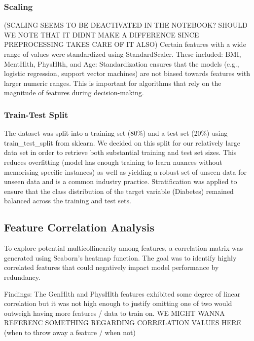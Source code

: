 \documentclass[a4paper,12pt]{article}
\begin{document}
\subsubsection{Scaling}
(SCALING SEEMS TO BE DEACTIVATED IN THE NOTEBOOK? SHOULD WE NOTE THAT IT DIDNT MAKE A DIFFERENCE SINCE PREPROCESSING TAKES CARE OF IT ALSO)
Certain features with a wide range of values were standardized using StandardScaler. These included:
BMI, MentHlth, PhysHlth, and Age: Standardization ensures that the models 
(e.g., logistic regression, support vector machines) are not biased towards features with larger 
numeric ranges. This is important for algorithms that rely on the magnitude of features during 
decision-making.

\subsubsection{Train-Test Split}
The dataset was split into a training set (80\%) and a test set (20\%) using train\_test\_split from 
sklearn. We decided on this split for our relatively large data set in order to retrieve both substantial 
training and test set sizes. This reduces overfitting (model has enough training to learn nuances without 
memorising specific instances) as well as yielding a robust set of unseen data for unseen data and is a common industry practice. 
Stratification was applied to ensure that the class distribution of the target variable 
(Diabetes) remained balanced across the training and test sets.

\subsection{Feature Correlation Analysis}
To explore potential multicollinearity among features, a correlation matrix was generated using 
Seaborn's heatmap function. The goal was to identify highly correlated features that could negatively 
impact model performance by redundancy.

Findings: The GenHlth and PhysHlth features exhibited some degree of linear correlation but it was
not high enough to justify omitting one of two would outweigh having more features / data to train 
on.
WE MIGHT WANNA REFERENC SOMETHING REGARDING CORRELATION VALUES HERE 
(when to throw away a feature / when not)
\end{document}
